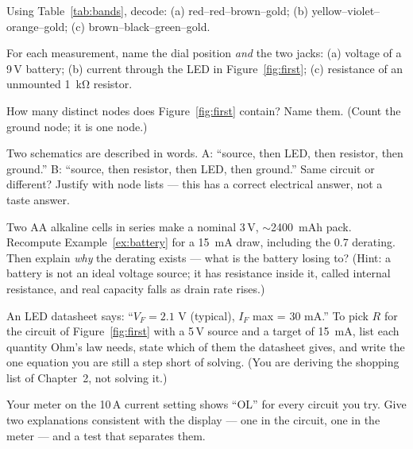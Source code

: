 \begin{exercise}[easy]
\label{ex:easy-bands}
Using Table~\ref{tab:bands}, decode: (a) red--red--brown--gold;
(b) yellow--violet--orange--gold; (c) brown--black--green--gold.
\end{exercise}

\begin{exercise}[easy]
\label{ex:dmm-select}
For each measurement, name the dial position \emph{and} the two jacks:
(a) voltage of a 9\,V battery; (b) current through the LED in
Figure~\ref{fig:first}; (c) resistance of an unmounted \qty{1}{\kilo\ohm}
resistor.
\end{exercise}

\begin{exercise}[easy]
\label{ex:nodes}
How many distinct nodes does Figure~\ref{fig:first} contain? Name them.
(Count the ground node; it is one node.)
\end{exercise}

\begin{exercise}[medium]
\label{ex:samecircuit}
Two schematics are described in words. A: ``source, then LED, then resistor,
then ground.'' B: ``source, then resistor, then LED, then ground.'' Same
circuit or different? Justify with node lists — this has a correct
electrical answer, not a taste answer.
\end{exercise}

\begin{exercise}[medium]
\label{ex:aa-life}
Two AA alkaline cells in series make a nominal 3\,V, $\sim$2400~mAh pack.
Recompute Example~\ref{ex:battery} for a 15~mA draw, including the 0.7
derating. Then explain \emph{why} the derating exists — what is the battery
losing to? (Hint: a battery is not an ideal voltage source; it has
resistance inside it, called internal resistance, and real capacity falls as
drain rate rises.)
\end{exercise}

\begin{exercise}
\label{ex:ledmissing}
An LED datasheet says: ``$V_F = 2.1$ V (typical), $I_F$ max = 30 mA.''
To pick $R$ for the circuit of Figure~\ref{fig:first} with a 5\,V source and a
target of 15~mA, list each quantity Ohm's law needs, state which of them the
datasheet gives, and write the one equation you are still a step short of
solving. (You are deriving the shopping list of Chapter~2, not solving it.)
\end{exercise}

\begin{exercise}[medium]
\label{ex:ol}
Your meter on the 10\,A current setting shows ``OL'' for every circuit you
try. Give two explanations consistent with the display — one in the circuit,
one in the meter — and a test that separates them.
\end{exercise}

